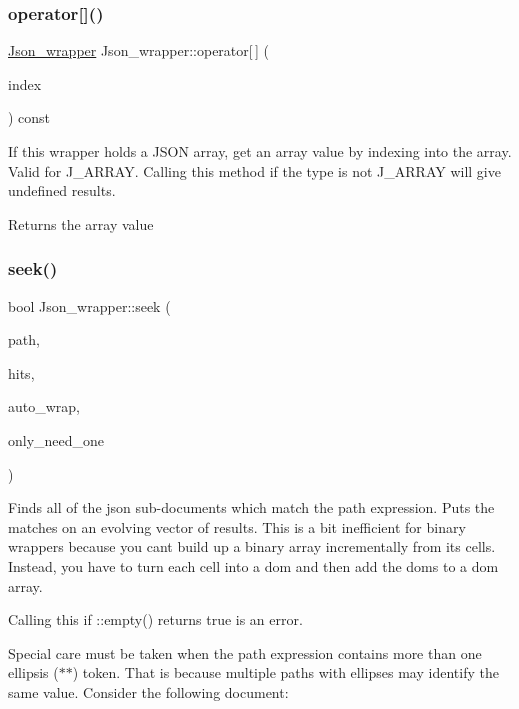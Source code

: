\subsubsection{\texorpdfstring{operator[]()}{operator[]()}}
{\footnotesize\ttfamily \mbox{\hyperlink{classJson__wrapper}{Json\+\_\+wrapper}} Json\+\_\+wrapper\+::operator\mbox{[}$\,$\mbox{]} (\begin{DoxyParamCaption}\item[{size\+\_\+t}]{index }\end{DoxyParamCaption}) const}

If this wrapper holds a J\+S\+ON array, get an array value by indexing into the array. Valid for J\+\_\+\+A\+R\+R\+AY. Calling this method if the type is not J\+\_\+\+A\+R\+R\+AY will give undefined results.

\begin{DoxyReturn}{Returns}
the array value 
\end{DoxyReturn}
\mbox{\label{classJson__wrapper_afcdaa3d406f1a1ab28da1330f0cf9680}} 
\subsubsection{\texorpdfstring{seek()}{seek()}}
{\footnotesize\ttfamily bool Json\+\_\+wrapper\+::seek (\begin{DoxyParamCaption}\item[{const \mbox{\hyperlink{classJson__seekable__path}{Json\+\_\+seekable\+\_\+path}} \&}]{path,  }\item[{Json\+\_\+wrapper\+\_\+vector $\ast$}]{hits,  }\item[{bool}]{auto\+\_\+wrap,  }\item[{bool}]{only\+\_\+need\+\_\+one }\end{DoxyParamCaption})}

Finds all of the json sub-\/documents which match the path expression. Puts the matches on an evolving vector of results. This is a bit inefficient for binary wrappers because you can\textquotesingle{}t build up a binary array incrementally from its cells. Instead, you have to turn each cell into a dom and then add the doms to a dom array.

Calling this if \+::empty() returns true is an error.

Special care must be taken when the path expression contains more than one ellipsis ($\ast$$\ast$) token. That is because multiple paths with ellipses may identify the same value. Consider the following document\+:

